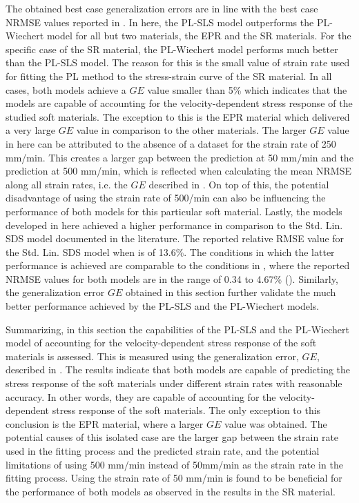 The obtained best case generalization errors are in line with the best case NRMSE values reported in . In here, the PL-SLS model outperforms the PL-Wiechert model for all but two materials, the EPR and the SR materials. For the specific case of the SR material, the PL-Wiechert model performs much better than the PL-SLS model. The reason for this is the small value of strain rate used for fitting the PL method to the stress-strain curve of the SR material. In all cases, both models achieve a $GE$ value smaller than 5\% which indicates that the models are capable of accounting for the velocity-dependent stress response of the studied soft materials. The exception to this is the EPR material which delivered a very large $GE$ value in comparison to the other materials. The larger $GE$ value in here can be attributed to the absence of a dataset for the strain rate of 250 mm/min. This creates a larger gap between the prediction at 50 mm/min and the prediction at 500 mm/min, which is reflected when calculating the mean NRMSE along all strain rates, i.e. the $GE$ described in . On top of this, the potential disadvantage of using the strain rate of 500/min can also be influencing the performance of both models for this particular soft material. Lastly, the models developed in here achieved a higher performance in comparison to the Std. Lin. SDS model documented in the literature. The reported relative RMSE value for the Std. Lin. SDS model when is of 13.6\%. The conditions in which the latter performance is achieved are comparable to the conditions in , where the reported NRMSE values for both models are in the range of 0.34 to 4.67\% (). Similarly, the generalization error $GE$ obtained in this section further validate the much better performance achieved by the PL-SLS and the PL-Wiechert models.

Summarizing, in this section the capabilities of the PL-SLS and the PL-Wiechert model of accounting for the velocity-dependent stress response of the soft materials is assessed. This is measured using the generalization error, $GE$, described in . The results indicate that both models are capable of predicting the stress response of the soft materials under different strain rates with reasonable accuracy. In other words, they are capable of accounting for the velocity-dependent stress response of the soft materials. The only exception to this conclusion is the EPR material, where a larger $GE$ value was obtained. The potential causes of this isolated case are the larger gap between the strain rate used in the fitting process and the predicted strain rate, and the potential limitations of using 500 mm/min instead of 50mm/min as the strain rate in the fitting process. Using the strain rate of 50 mm/min is found to be beneficial for the performance of both models as observed in the results in the SR material.

